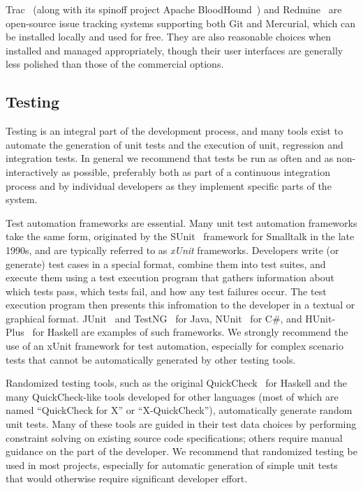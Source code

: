 Trac~\cite{Trac} (along with its spinoff project Apache
BloodHound~\cite{ApacheBloodhound}) and Redmine~\cite{Redmine} are
open-source issue tracking systems supporting both Git and Mercurial,
which can be installed locally and used for free. They are also
reasonable choices when installed and managed appropriately, though
their user interfaces are generally less polished than those of the
commercial options.

\subsection{Testing}

Testing is an integral part of the development process, and many tools
exist to automate the generation of unit tests and the execution of
unit, regression and integration tests. In general we recommend that
tests be run as often and as non-interactively as possible, preferably
both as part of a continuous integration process and by individual
developers as they implement specific parts of the system.

Test automation frameworks are essential. Many unit test automation
frameworks take the same form, originated by the SUnit~\cite{SUnit}
framework for Smalltalk in the late 1990s, and are typically referred
to as \emph{xUnit} frameworks. Developers write (or generate) test
cases in a special format, combine them into test suites, and execute
them using a test execution program that gathers information about
which tests pass, which tests fail, and how any test failures
occur. The test execution program then presents this infromation to
the developer in a textual or graphical format.  JUnit~\cite{JUnit}
and TestNG~\cite{TestNG} for Java, NUnit~\cite{NUnit} for C\#, and
HUnit-Plus~\cite{HUnit-Plus} for Haskell are examples of such
frameworks. We strongly recommend the use of an xUnit framework for
test automation, especially for complex scenario tests that cannot be
automatically generated by other testing tools.

Randomized testing tools, such as the original
QuickCheck~\cite{QuickCheck} for Haskell and the many QuickCheck-like
tools developed for other languages (most of which are named
``QuickCheck for X'' or ``X-QuickCheck''), automatically generate
random unit tests. Many of these tools are guided in their test data
choices by performing constraint solving on existing source code
specifications; others require manual guidance on the part of the
developer. We recommend that randomized testing be used in most
projects, especially for automatic generation of simple unit tests
that would otherwise require significant developer effort.


